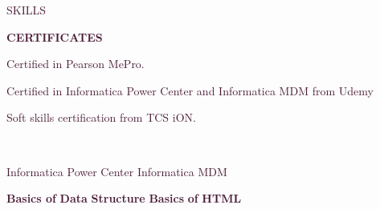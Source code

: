 \documentclass[12pt]{article}
\begin{document}
\begin{flushleft}

 \textcolor[HTML]{481A34}{SKILLS}
\end{flushleft}
\begin{center}

 \textcolor[HTML]{481A34}{\textbf{CERTIFICATES}}
\end{center}
\begin{justify}
\textcolor[HTML]{481A34}{Certified} \textcolor[HTML]{481A34}{ } \textcolor[HTML]{481A34}{in} \textcolor[HTML]{481A34}{ } \textcolor[HTML]{481A34}{Pearson} \textcolor[HTML]{481A34}{ } \textcolor[HTML]{481A34}{MePro.}
\end{justify}
\begin{justify}
\textcolor[HTML]{481A34}{Certified} \textcolor[HTML]{481A34}{ } \textcolor[HTML]{481A34}{in} \textcolor[HTML]{481A34}{ } \textcolor[HTML]{481A34}{Informatica} \textcolor[HTML]{481A34}{ } \textcolor[HTML]{481A34}{Power} \textcolor[HTML]{481A34}{ } \textcolor[HTML]{481A34}{Center} \textcolor[HTML]{481A34}{ } \textcolor[HTML]{481A34}{and} \textcolor[HTML]{481A34}{ } \textcolor[HTML]{481A34}{Informatica} \textcolor[HTML]{481A34}{ } \textcolor[HTML]{481A34}{MDM} \textcolor[HTML]{481A34}{ } \textcolor[HTML]{481A34}{from} \textcolor[HTML]{481A34}{ } \textcolor[HTML]{481A34}{Udemy}
\end{justify}
\begin{justify}
\textcolor[HTML]{481A34}{Soft} \textcolor[HTML]{481A34}{ } \textcolor[HTML]{481A34}{skills} \textcolor[HTML]{481A34}{ } \textcolor[HTML]{481A34}{certification} \textcolor[HTML]{481A34}{ } \textcolor[HTML]{481A34}{from} \textcolor[HTML]{481A34}{ } \textcolor[HTML]{481A34}{TCS} \textcolor[HTML]{481A34}{ } \textcolor[HTML]{481A34}{iON.}
\end{justify}
\\
\begin{justify}
\textcolor[HTML]{481A34}{Informatica} \textcolor[HTML]{481A34}{ } \textcolor[HTML]{481A34}{Power} \textcolor[HTML]{481A34}{ } \textcolor[HTML]{481A34}{Center} \textcolor[HTML]{481A34}{ } \textcolor[HTML]{481A34}{Informatica} \textcolor[HTML]{481A34}{ } \textcolor[HTML]{481A34}{MDM}
\end{justify}
\begin{flushleft}
\textcolor[HTML]{481A34}{\textbf{Basics of}} \textcolor[HTML]{481A34}{\textbf{ }} \textcolor[HTML]{481A34}{\textbf{Data}} \textcolor[HTML]{481A34}{\textbf{ }} \textcolor[HTML]{481A34}{\textbf{Structure}} \textcolor[HTML]{481A34}{\textbf{ }} \textcolor[HTML]{481A34}{\textbf{Basics}} \textcolor[HTML]{481A34}{\textbf{ }} \textcolor[HTML]{481A34}{\textbf{of}} \textcolor[HTML]{481A34}{\textbf{ }} \textcolor[HTML]{481A34}{\textbf{HTML}}
\end{flushleft}
\end{document}
